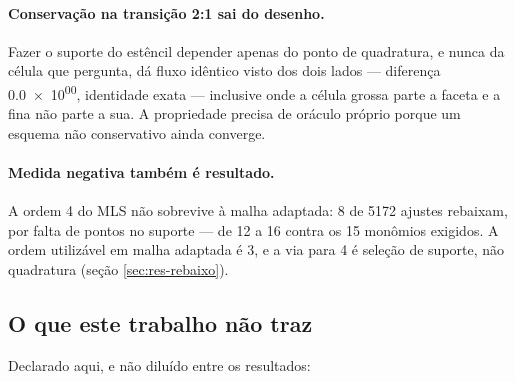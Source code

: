 \paragraph{Conservação na transição 2:1 sai do desenho.} Fazer o suporte do
estêncil depender apenas do ponto de quadratura, e nunca da célula que pergunta,
dá fluxo idêntico visto dos dois lados --- diferença \num{0.0e+00}, identidade
exata --- inclusive onde a célula grossa parte a faceta e a fina não parte a sua.
A propriedade precisa de oráculo próprio porque um esquema não conservativo ainda
converge.

\paragraph{Medida negativa também é resultado.} A ordem 4 do MLS não sobrevive à
malha adaptada: 8 de \num{5172} ajustes rebaixam, por falta de pontos no suporte
--- de 12 a 16 contra os 15 monômios exigidos. A ordem utilizável em malha
adaptada é 3, e a via para 4 é seleção de suporte, não quadratura (seção
\ref{sec:res-rebaixo}).

\subsection{O que este trabalho não traz}
\label{sec:conc-falta}

Declarado aqui, e não diluído entre os resultados:

